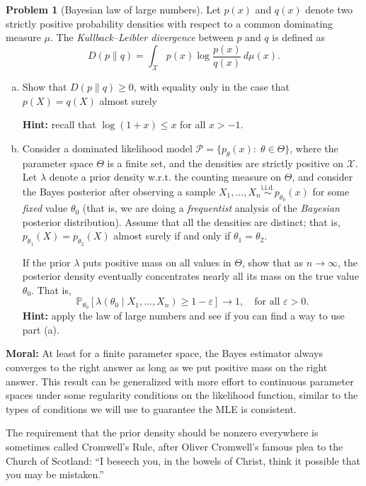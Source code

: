\documentclass{article}
\newcommand{\cP}{\mathcal{P}}
\newcommand{\cX}{\mathcal{X}}
\newcommand{\PP}{\mathbb{P}}
\newcommand{\simiid}{\overset{\text{i.i.d.}}{\sim}}
\newcommand{\ep}{\varepsilon}
\theoremstyle{definition}
\newtheorem{problem}{Problem}
\begin{document}
\begin{problem}[Bayesian law of large numbers]

Let $p(x)$ and $q(x)$ denote two strictly positive probability densities with respect to a common dominating measure $\mu$. The {\em Kullback--Leibler divergence} between $p$ and $q$ is defined as
\[
D(p \| q) = \int_{\cX} p(x) \log \frac{p(x)}{q(x)} \,d\mu(x).
\]


\begin{enumerate}[(a)]
\item Show that $D(p \| q) \geq 0$, with equality only in the case that $p(X) = q(X)$ almost surely 

{\bf Hint:} recall that $\log(1+x) \leq x$ for all $x>-1$.



\item Consider a dominated likelihood model $\cP = \{p_{\theta}(x):\; \theta\in \Theta\}$, where the parameter space $\Theta$ is a finite set, and the densities are strictly positive on $\cX$. Let $\lambda$ denote a prior density w.r.t. the counting measure on $\Theta$, and consider the Bayes posterior after observing a sample $X_1,\ldots,X_n \simiid p_{\theta_0}(x)$ for some {\em fixed} value $\theta_0$ (that is, we are doing a {\em frequentist} analysis of the {\em Bayesian} posterior distribution).  Assume that all the densities are distinct; that is, $p_{\theta_1}(X) = p_{\theta_2}(X)$ almost surely if and only if $\theta_1=\theta_2$.

If the prior $\lambda$ puts positive mass on all values in $\Theta$, show that as $n\to\infty$, the posterior density eventually concentrates nearly all its mass on the true value $\theta_0$. That is, 
\[
\PP_{\theta_0}\left[\lambda(\theta_0 \mid X_1,\ldots,X_n) \geq 1-\ep\right] \to 1, \quad \text{for all } \ep > 0.
\]
{\bf Hint:} apply the law of large numbers and see if you can find a way to use part (a).


\end{enumerate}

{\bf Moral:} At least for a finite parameter space, the Bayes estimator always converges to the right answer as long as we put positive mass on the right answer. This result can be generalized with more effort to continuous parameter spaces under some regularity conditions on the likelihood function, similar to the types of conditions we will use to guarantee the MLE is consistent. 

The requirement that the prior density should be nonzero everywhere is sometimes called Cromwell's Rule, after Oliver Cromwell's famous plea to the Church of Scotland: ``I beseech you, in the bowels of Christ, think it possible that you may be mistaken.''

\end{problem}
\end{document}
